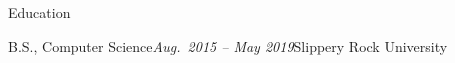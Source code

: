 \documentclass{resume} %
\begin{document}
\begin{rSection}{Education}

\begin{rSubsection}{B.S., Computer Science}{\em Aug.\ 2015 – May 2019}{Slippery Rock University}{}
\item[]
\end{rSubsection}

\end{rSection}




\end{document}
